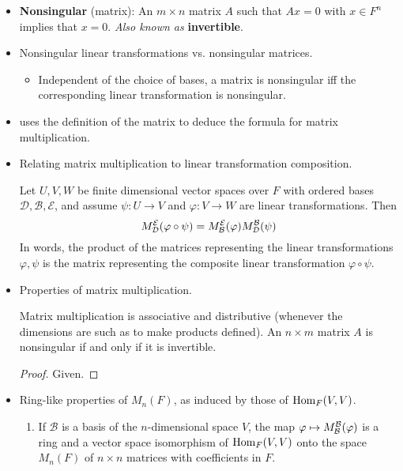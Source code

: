 \documentclass[../notes.tex]{subfiles}
\begin{document}
\begin{itemize}
\begin{corollary}
    \end{corollary}
    \item \textbf{Nonsingular} (matrix): An $m\times n$ matrix $A$ such that $Ax=0$ with $x\in F^n$ implies that $x=0$. \emph{Also known as} \textbf{invertible}.
    \item Nonsingular linear transformations vs. nonsingular matrices.
    \begin{itemize}
        \item Independent of the choice of bases, a matrix is nonsingular iff the corresponding linear transformation is nonsingular.
    \end{itemize}
    \item \textcite{bib:DummitFoote} uses the definition of the matrix to deduce the formula for matrix multiplication.
    \item Relating matrix multiplication to linear transformation composition.
    \begin{theorem}\label{trm:11.12}
        Let $U,V,W$ be finite dimensional vector spaces over $F$ with ordered bases $\mathcal{D},\mathcal{B},\mathcal{E}$, and assume $\psi:U\to V$ and $\varphi:V\to W$ are linear transformations. Then
        \begin{equation*}
            M_\mathcal{D}^\mathcal{E}(\varphi\circ\psi) = M_\mathcal{B}^\mathcal{E}(\varphi)M_\mathcal{D}^\mathcal{B}(\psi)
        \end{equation*}
        In words, the product of the matrices representing the linear transformations $\varphi,\psi$ is the matrix representing the composite linear transformation $\varphi\circ\psi$.
    \end{theorem}
    \item Properties of matrix multiplication.
    \begin{corollary}\label{cly:11.13}
        Matrix multiplication is associative and distributive (whenever the dimensions are such as to make products defined). An $n\times m$ matrix $A$ is nonsingular if and only if it is invertible.
        \begin{proof}
            Given.
        \end{proof}
    \end{corollary}
    \item Ring-like properties of $M_n(F)$, as induced by those of $\operatorname{Hom}_F(V,V)$.
    \begin{corollary}\label{cly:11.14}\leavevmode
        \begin{enumerate}
            \item If $\mathcal{B}$ is a basis of the $n$-dimensional space $V$, the map $\varphi\mapsto M_\mathcal{B}^\mathcal{B}(\varphi)$ is a ring and a vector space isomorphism of $\operatorname{Hom}_F(V,V)$ onto the space $M_n(F)$ of $n\times n$ matrices with coefficients in $F$.

\end{enumerate}
\end{corollary}
\end{itemize}
\end{document}

